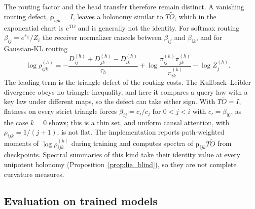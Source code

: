 \documentclass[twoside,11pt]{article}
\begin{document}
The routing factor and the head transfer therefore remain distinct. A vanishing routing defect, $\boldsymbol\rho_{ijk}=I$, leaves a holonomy similar to $T\widetilde O$, which in the exponential chart is $e^{TO}$ and is generally not the identity. For softmax routing $\beta_{ij}=e^{s_{ij}}/Z_i$ the receiver normalizer cancels between $\beta_{ij}$ and $\beta_{ik}$, and for Gaussian-KL routing
\begin{equation}
\log\rho_{ijk}^{(h)}=-\frac{D_{ij}^{(h)}+D_{jk}^{(h)}-D_{ik}^{(h)}}{\tau_h}+\log\frac{\pi_{ij}^{(h)}\pi_{jk}^{(h)}}{\pi_{ik}^{(h)}}-\log Z_j^{(h)}.
\label{eq:lie_kl_triangle}
\end{equation}
The leading term is the triangle defect of the routing costs. The Kullback--Leibler divergence obeys no triangle inequality, and here it compares a query law with a key law under different maps, so the defect can take either sign. With $T\widetilde O=I$, flatness on every strict triangle forces $\beta_{ij}=c_i/c_j$ for $0<j<i$ with $c_i=\beta_{i0}$, as the case $k=0$ shows; this is a thin set, and uniform causal attention, with $\rho_{ijk}=1/(j+1)$, is not flat. The implementation reports path-weighted moments of $\log\rho_{ijk}^{(h)}$ during training and computes spectra of $\boldsymbol\rho_{ijk}T\widetilde O$ from checkpoints. Spectral summaries of this kind take their identity value at every unipotent holonomy (Proposition~\ref{prop:lie_blind}), so they are not complete curvature measures.

\subsection{Evaluation on trained models}
\label{supp:holonomy_numerics}
\end{document}
